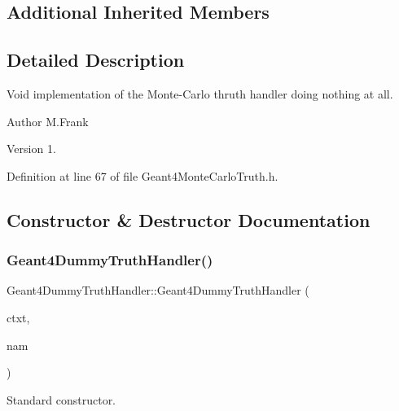 \subsection*{Additional Inherited Members}


\subsection{Detailed Description}
Void implementation of the Monte-\/\+Carlo thruth handler doing nothing at all. 

\begin{DoxyAuthor}{Author}
M.\+Frank 
\end{DoxyAuthor}
\begin{DoxyVersion}{Version}
1. 
\end{DoxyVersion}


Definition at line 67 of file Geant4\+Monte\+Carlo\+Truth.\+h.



\subsection{Constructor \& Destructor Documentation}
\hypertarget{class_d_d4hep_1_1_simulation_1_1_geant4_dummy_truth_handler_a5c401a9e0de83670c8e61da169bdd56e}{}\label{class_d_d4hep_1_1_simulation_1_1_geant4_dummy_truth_handler_a5c401a9e0de83670c8e61da169bdd56e} 
\subsubsection{\texorpdfstring{Geant4\+Dummy\+Truth\+Handler()}{Geant4DummyTruthHandler()}}
{\footnotesize\ttfamily Geant4\+Dummy\+Truth\+Handler\+::\+Geant4\+Dummy\+Truth\+Handler (\begin{DoxyParamCaption}\item[{\hyperlink{class_d_d4hep_1_1_simulation_1_1_geant4_context}{Geant4\+Context} $\ast$}]{ctxt,  }\item[{const std\+::string \&}]{nam }\end{DoxyParamCaption})}



Standard constructor. 



